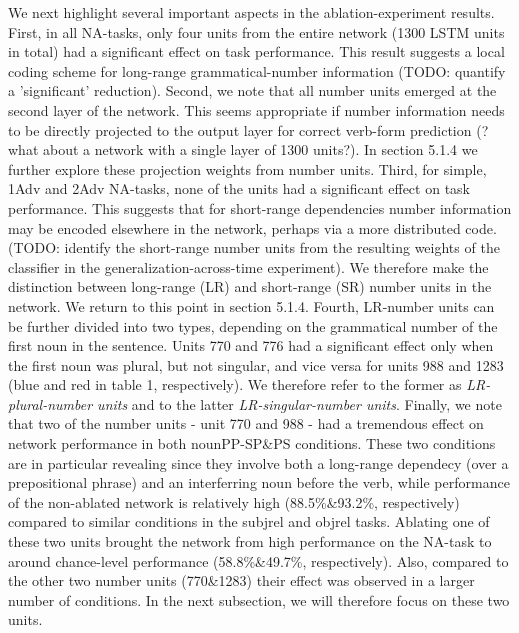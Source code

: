 We next highlight several important aspects in the ablation-experiment results. First, in all NA-tasks, only four units from the entire network (1300 LSTM units in total) had a significant effect on task performance. This result suggests a local coding scheme for long-range grammatical-number information (TODO: quantify a 'significant' reduction). Second, we note that all number units emerged at the second layer of the network. This seems appropriate if number information needs to be directly projected to the output layer for correct verb-form prediction (?what about a network with a single layer of 1300 units?). In section 5.1.4 we further explore these projection weights from number units. Third, for simple, 1Adv and 2Adv NA-tasks, none of the units had a significant effect on task performance. This suggests that for short-range dependencies number information may be encoded elsewhere in the network, perhaps via a more distributed code. (TODO: identify the short-range number units from the resulting weights of the classifier in the generalization-across-time experiment). We therefore make the distinction between long-range (LR) and short-range (SR) number units in the network. We return to this point in section 5.1.4. Fourth, LR-number units can be further divided into two types, depending on the grammatical number of the first noun in the sentence. Units 770 and 776 had a significant effect only when the first noun was plural, but not singular, and vice versa for units 988 and 1283 (blue and red in table 1, respectively). We therefore refer to the former as \textit{LR-plural-number units} and to the latter \textit{LR-singular-number units}. Finally, we note that two of the number units - unit 770 and 988 - had a tremendous effect on network performance in both nounPP-SP\&PS conditions. These two conditions are in particular revealing since they involve both a long-range dependecy (over a prepositional phrase) and an interferring noun before the verb, while performance of the non-ablated network is relatively high (88.5\%\&93.2\%, respectively) compared to similar conditions in the subjrel and objrel tasks. Ablating one of these two units brought the network from high performance on the NA-task to around chance-level performance (58.8\%\&49.7\%, respectively). Also, compared to the other two number units (770\&1283) their effect was observed in a larger number of conditions. In the next subsection, we will therefore focus on these two units.

